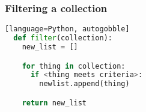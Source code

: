 \documentclass{beamer}
\begin{document}
%
%
\begin{frame}[fragile]
  \frametitle{Filtering a collection}
  \begin{lstlisting}[language=Python, autogobble][language=Python, autogobble]
  def filter(collection):
    new_list = []

    for thing in collection:
      if <thing meets criteria>:
        newlist.append(thing)

    return new_list
  \end{lstlisting}
\end{frame}
\end{document}
